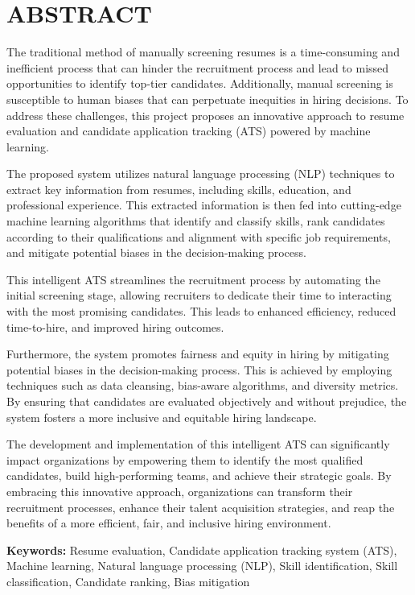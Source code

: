 \chapter*{ABSTRACT}
The traditional method of manually screening resumes is a time-consuming and inefficient process that can hinder the recruitment process and lead to missed opportunities to identify top-tier candidates. Additionally, manual screening is susceptible to human biases that can perpetuate inequities in hiring decisions. To address these challenges, this project proposes an innovative approach to resume evaluation and candidate application tracking (ATS) powered by machine learning.

The proposed system utilizes natural language processing (NLP) techniques to extract key information from resumes, including skills, education, and professional experience. This extracted information is then fed into cutting-edge machine learning algorithms that identify and classify skills, rank candidates according to their qualifications and alignment with specific job requirements, and mitigate potential biases in the decision-making process.

This intelligent ATS streamlines the recruitment process by automating the initial screening stage, allowing recruiters to dedicate their time to interacting with the most promising candidates. This leads to enhanced efficiency, reduced time-to-hire, and improved hiring outcomes.

Furthermore, the system promotes fairness and equity in hiring by mitigating potential biases in the decision-making process. This is achieved by employing techniques such as data cleansing, bias-aware algorithms, and diversity metrics. By ensuring that candidates are evaluated objectively and without prejudice, the system fosters a more inclusive and equitable hiring landscape.

The development and implementation of this intelligent ATS can significantly impact organizations by empowering them to identify the most qualified candidates, build high-performing teams, and achieve their strategic goals. By embracing this innovative approach, organizations can transform their recruitment processes, enhance their talent acquisition strategies, and reap the benefits of a more efficient, fair, and inclusive hiring environment.

\textbf{Keywords:} Resume evaluation, Candidate application tracking system (ATS), Machine learning, Natural language processing (NLP), Skill identification, Skill classification, Candidate ranking, Bias mitigation
